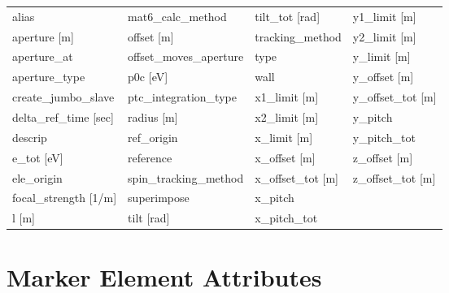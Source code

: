  \begin{tabular}{llll} \toprule
alias                          & mat6_calc_method               & tilt_tot [rad]                 & y1_limit [m]                   \\
aperture [m]                   & offset [m]                     & tracking_method                & y2_limit [m]                   \\
aperture_at                    & offset_moves_aperture          & type                           & y_limit [m]                    \\
aperture_type                  & p0c [eV]                       & wall                           & y_offset [m]                   \\
create_jumbo_slave             & ptc_integration_type           & x1_limit [m]                   & y_offset_tot [m]               \\
delta_ref_time [sec]           & radius [m]                     & x2_limit [m]                   & y_pitch                        \\
descrip                        & ref_origin                     & x_limit [m]                    & y_pitch_tot                    \\
e_tot [eV]                     & reference                      & x_offset [m]                   & z_offset [m]                   \\
ele_origin                     & spin_tracking_method           & x_offset_tot [m]               & z_offset_tot [m]               \\
focal_strength [1/m]           & superimpose                    & x_pitch                        &                                \\
l [m]                          & tilt [rad]                     & x_pitch_tot                    &                                \\
 \bottomrule
 \end{tabular}
 \vfill

 \section{Marker Element Attributes}
 \label{s:list.marker}

